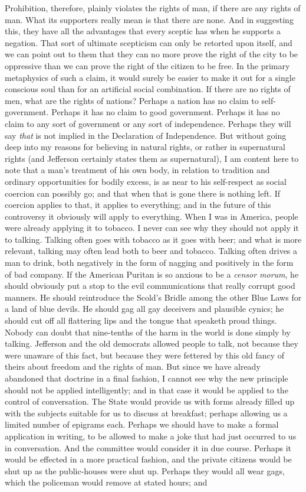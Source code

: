 \documentclass{book}
\begin{document}
Prohibition, therefore, plainly violates the rights of man, if there are any rights of man. What its supporters really mean is that there are none. And in suggesting this, they have all the advantages that every sceptic has when he supports a negation. That sort of ultimate scepticism can only be retorted upon itself, and we can point out to them that they can no more prove the right of the city to be oppressive than we can prove the right of the citizen to be free. In the primary metaphysics of such a claim, it would surely be easier to make it out for a single conscious soul than for an artificial social combination. If there are no rights of men, what are the rights of nations? Perhaps a nation has no claim to self-government. Perhaps it has no claim to good government. Perhaps it has no claim to any sort of government or any sort of independence. Perhaps they will say \emph{that} is not implied in the Declaration of Independence. But without going deep into my reasons for believing in natural rights, or rather in supernatural rights (and Jefferson certainly states them as supernatural), I am content here to note that a man’s treatment of his own body, in relation to tradition and ordinary opportunities for bodily excess, is as near to his self-respect as social coercion can possibly go; and that when that is gone there is nothing left. If coercion applies to that, it applies to everything; and in the future of this controversy it obviously will apply to everything. When I was in America, people were already applying it to tobacco. I never can see why they should not apply it to talking. Talking often goes with tobacco as it goes with beer; and what is more relevant, talking may often lead both to beer and tobacco. Talking often drives a man to drink, both negatively in the form of nagging and positively in the form of bad company. If the American Puritan is so anxious to be a \emph{censor morum}, he should obviously put a stop to the evil communications that really corrupt good manners. He should reintroduce the Scold’s Bridle among the other Blue Laws for a land of blue devils. He should gag all gay deceivers and plausible cynics; he should cut off all flattering lips and the tongue that speaketh proud things. Nobody can doubt that nine-tenths of the harm in the world is done simply by talking. Jefferson and the old democrats allowed people to talk, not because they were unaware of this fact, but because they were fettered by this old fancy of theirs about freedom and the rights of man. But since we have already abandoned that doctrine in a final fashion, I cannot see why the new principle should not be applied intelligently; and in that case it would be applied to the control of conversation. The State would provide us with forms already filled up with the subjects suitable for us to discuss at breakfast; perhaps allowing us a limited number of epigrams each. Perhaps we should have to make a formal application in writing, to be allowed to make a joke that had just occurred to us in conversation. And the committee would consider it in due course. Perhaps it would be effected in a more practical fashion, and the private citizens would be shut up as the public-houses were shut up. Perhaps they would all wear gags, which the policeman would remove at stated hours; and 
\end{document}
